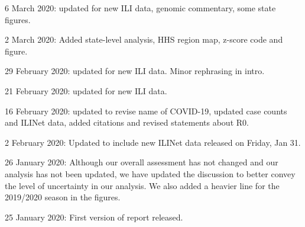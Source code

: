 \documentclass[]{article}
\begin{document}
6 March 2020: updated for new ILI data, genomic commentary, some state
figures.

2 March 2020: Added state-level analysis, HHS region map, z-score code
and figure.

29 February 2020: updated for new ILI data. Minor rephrasing in intro.

21 February 2020: updated for new ILI data.

16 February 2020: updated to revise name of COVID-19, updated case
counts and ILINet data, added citations and revised statements about R0.

2 February 2020: Updated to include new ILINet data released on Friday,
Jan 31.

26 January 2020: Although our overall assessment has not changed and our
analysis has not been updated, we have updated the discussion to better
convey the level of uncertainty in our analysis. We also added a heavier
line for the 2019/2020 season in the figures.

25 January 2020: First version of report released.
\end{document}
